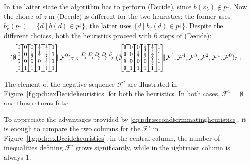 \begin{example}
	In the latter state the algorithm has to perform (Decide), since $b(x_5) \notin p^\downarrow$.
	Now the choice of $z$ in (Decide) is different for the two heuristics: the former uses $b_r^\downarrow(p^\downarrow) = \{d \mid b(d) \in p^\downarrow \}$, the latter uses $\{d \mid b_\zeta(d) \in p^\downarrow \}$. Despite the different choices, both the heuristics proceed with $6$ steps of (Decide):
	{\footnotesize
	\begin{align*}
		(\emptyset\cvec{0}{0}{0}{0}\cvec{0}{0}{0}{1} \cvec{0}{\frac{1}{2}}{0}{1}\cvec{\frac{1}{4}}{\frac{1}{2}}{0}{1} \cvec{\frac{1}{4}}{\frac{5}{8}}{\frac{1}{4}}{1} \cvec{1}{1}{1}{1} \|  \mathcal{F}^0 )_{7,6} \tr{D}
		\tr{D} %
		\tr{D} %
		\tr{D} %
		\tr{D} (\emptyset\cvec{0}{0}{0}{0}\cvec{0}{0}{0}{1} \cvec{0}{\frac{1}{2}}{0}{1}\cvec{\frac{1}{4}}{\frac{1}{2}}{0}{1} \cvec{\frac{1}{4}}{\frac{5}{8}}{\frac{1}{4}}{1} \cvec{1}{1}{1}{1} \|  \mathcal{F}^5,\mathcal{F}^4, \mathcal{F}^3,\mathcal{F}^2,\mathcal{F}^1, \mathcal{F}^0 )_{7,1}
	\end{align*}
	}

	The element of the negative sequence $\mathcal{F}^i$ are illustrated in Figure~\ref{fig:pdr:exDecideheuristics} for both the heuristics. In both cases, $\mathcal{F}^5=\emptyset$ and thus {\ADPDR} returns false.

	To appreciate the advantages provided by \eqref{eq:pdr:secondterminatingheuristics}, it is  enough to compare the two columns for the $\mathcal{F}^i$ in Figure~\ref{fig:pdr:exDecideheuristics}:  in the central column, the number of inequalities defining $\mathcal{F}^i$ grows significantly, while in the rightmost column is always $1$.
\end{example}

